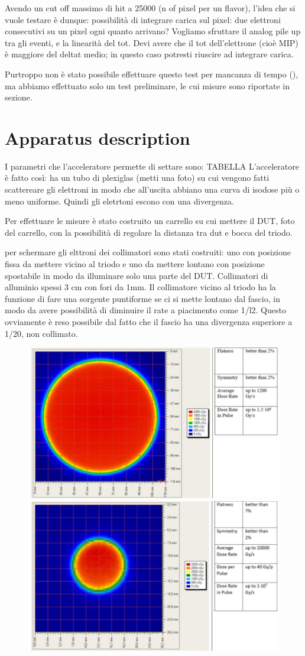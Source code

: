 Avendo un cut off massimo di hit a 25000 (n of pixel per un flavor), l'idea che si vuole testare è dunque: possibilità di integrare carica sul pixel: due elettroni consecutivi su un pixel ogni quanto arrivano?
Vogliamo sfruttare il analog pile up tra gli eventi, e la linearità del tot. 
Devi avere che il tot dell'elettrone (cioè MIP) è maggiore del deltat medio; in questo caso potresti riuscire ad integrare carica.

Purtroppo non è stato possibile effettuare questo test per mancanza di tempo (), ma abbiamo effettuato solo un test preliminare, le cui misure sono riportate in sezione. 
   

\section{Apparatus description}
   I parametri che l'acceleratore permette di settare sono: TABELLA
   L'acceleratore è fatto così: ha un tubo di plexiglas (metti una foto) su cui vengono fatti scattereare gli elettroni in modo che all'uscita abbiano una curva di isodose più o meno uniforme. Quindi gli eletrtoni escono con una divergenza.

   Per effettuare le misure è stato costruito un carrello su cui mettere il DUT, foto del carrello, con la possibilità di regolare la distanza tra dut e bocca del triodo. 

   per schermare gli elttroni dei collimatori sono stati costruiti: uno con posizione fissa da mettere vicino al triodo e uno da mettere lontano con posizione spostabile in modo da illuminare solo una parte del DUT. 
   Collimatori di alluminio spessi 3 cm con fori da 1mm. Il collimatore vicino al triodo ha la funzione di fare una sorgente puntiforme se ci si mette lontano dal fascio, in modo da avere possibilità di diminuire il rate a piacimento come 1/l2.
   Questo ovviamente è reso possibile dal fatto che il fascio ha una divergenza superiore a 1/20, non collimato. 
   \begin{figure}[h!]
      \centering
      \includegraphics[width=.49\linewidth]{figures/test_beam/dose_profile_10cm.pdf}
      \includegraphics[width=.49\linewidth]{figures/test_beam/dose_profile_1cm.pdf}
      \caption{}
      \label{fig:dose_profile}
   \end{figure}     


